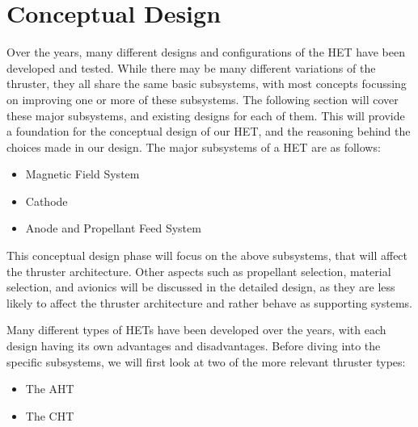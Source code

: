 \chapter{Conceptual Design}

Over the years, many different designs and configurations of the \ac{HET} have been developed and tested. While there may be many different variations of the thruster, they all share the same basic subsystems, with most concepts focussing on improving one or more of these subsystems. The following section will cover these major subsystems, and existing designs for each of them. This will provide a foundation for the conceptual design of our \ac{HET}, and the reasoning behind the choices made in our design. The major subsystems of a \ac{HET} are as follows:

\begin{itemize}
    \item Magnetic Field System
    \item Cathode
    \item Anode and Propellant Feed System
\end{itemize}

This conceptual design phase will focus on the above subsystems, that will affect the thruster architecture. Other aspects such as propellant selection, material selection, and avionics will be discussed in the detailed design, as they are less likely to affect the thruster architecture and rather behave as supporting systems.

Many different types of \ac{HET}s have been developed over the years, with each design having its own advantages and disadvantages. Before diving into the specific subsystems, we will first look at two of the more relevant thruster types:

\begin{itemize}
    \item The \ac{AHT}
    \item The \ac{CHT}
\end{itemize}